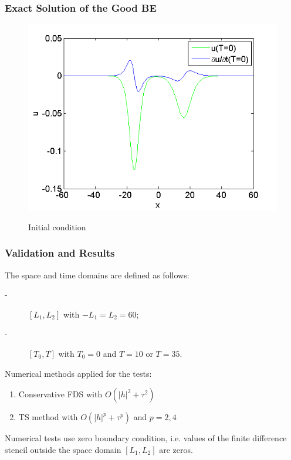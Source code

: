 \documentclass{beamer}
\begin{document}

\begin{frame}
\frametitle{Exact Solution of the Good BE}
\begin{figure}[ht]
	\centering
	\includegraphics[width=0.84\linewidth]{../IC.png}

Initial condition
\end{figure}
\end{frame}

\begin{frame}
\frametitle{Validation and Results}
The space and time domains are defined as follows:
\begin{description}
 \item[-] $[L_1,L_2]$ with $-L_1 = L_2 = 60$;
 \item[-] $[T_0,T]$ with $T_0 = 0$ and $T = 10$ or $T = 35$.
\end{description}

Numerical methods applied for the tests:
\begin{enumerate}
  \item Conservative FDS with $O(|h|^2 + \tau^2)$
  \item TS method with $O(|h|^p + \tau^p)$ and $p = 2, 4$
\end{enumerate}

Numerical tests use zero boundary condition, i.e. values of the finite difference stencil outside the space domain $[L_1,L_2]$ are zeros.
\end{frame}
\end{document}
